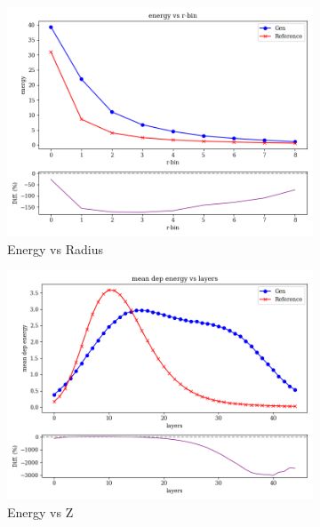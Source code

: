 \begin{figure}
    \centering
    \begin{subfigure}[b]{0.3\textwidth}
        \centering
        \includegraphics[width=\textwidth]{Figures/quantile2.png}
        \caption{Energy vs Radius}
        \label{fig:quantile2}
    \end{subfigure}
    \hfill
    \begin{subfigure}[b]{0.3\textwidth}
        \centering
        \includegraphics[width=\textwidth]{Figures/quantile3.png}
        \caption{Energy vs Z}
        \label{fig:quantile3}
    \end{subfigure}
    \hfill
    \begin{subfigure}[b]{0.3\textwidth}

\end{subfigure}
\end{figure}
